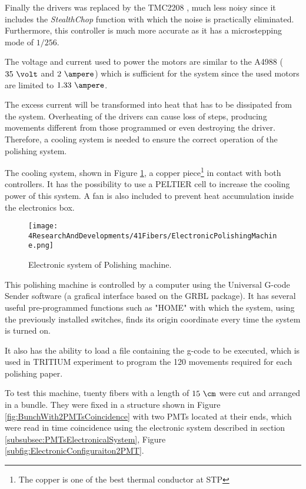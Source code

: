 \begin{enumerate}
Finally the drivers was replaced by the TMC2208 \cite{TMC2208Driver}, much less noisy since it includes the \textit{StealthChop} function with which the noise is practically eliminated. Furthermore, this controller is much more accurate as it has a microstepping mode of $1/256$.

The voltage and current used to power the motors are similar to the A4988 ($35~\volt$ and $2~\ampere$) which is sufficient for the system since the used motors are limited to $1.33~\ampere$. 

The excess current will be transformed into heat that has to be dissipated from the system. Overheating of the drivers can cause loss of steps, producing movements different from those programmed or even destroying the driver. Therefore, a cooling system is needed to ensure the correct operation of the polishing system.

The cooling system, shown in Figure \ref{fig:ElectronicSystemPolishingMachine}, a copper piece\footnote{The copper is one of the best thermal conductor at STP} in contact with both controllers. It has the possibility to use a PELTIER cell to increase the cooling power of this system. A fan is also included to prevent heat accumulation inside the electronics box.

\begin{figure}[h]
\centering
\texttt{[image: 4ResearchAndDevelopments/41Fibers/ElectronicPolishingMachine.png]}
\caption{Electronic system of Polishing machine.\label{fig:ElectronicSystemPolishingMachine}}
\end{figure}

\end{enumerate}

This polishing machine is controlled by a computer using the Universal G-code Sender software (a grafical interface based on the GRBL package). It has several useful pre-programmed functions such as "HOME" with which the system, using the previously installed switches, finds its origin coordinate every time the system is turned on. 

It also has the ability to load a file containing the g-code to be executed, which is used in TRITIUM experiment to program the 120 movements required for each polishing paper.

To test this machine, tuenty fibers with a length of $15~\cm$ were cut and arranged in a bundle. They were fixed in a structure shown in Figure \ref{fig:BunchWith2PMTsCoincidence} with two PMTs located at their ends, which were read in time coincidence using the electronic system described in section \ref{subsubsec:PMTsElectronicalSystem}, Figure \ref{subfig:ElectronicConfiguraiton2PMT}.

